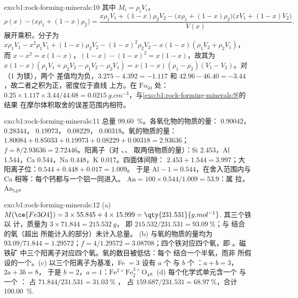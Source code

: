\begin{solution}{exo:b1:rock-forming-minerals:10}
其中 $M_i = \rho_i V_i$，
\[
  \rho(x) - \bigl(x\rho_1 + (1 - x)\rho_2\bigr)
  = \frac{x\rho_1V_1 + (1 - x)\rho_2V_2 - \bigl(x\rho_1 + (1 - x)\rho_2\bigr)\bigl(xV_1 + (1 - x)V_2\bigr)}{V(x)} .
\]
展开乘积，分子为 $x\rho_1V_1 - x^2\rho_1V_1 +
(1 - x)\rho_2V_2 - (1 - x)^2\rho_2V_2 - x(1 - x)(\rho_1V_2 + \rho_2V_1)$，而
$x - x^2 = x(1 - x)$，$(1 - x) - (1 - x)^2 = x(1 - x)$，故其为
$x(1 - x)(\rho_1V_1 + \rho_2V_2 - \rho_1V_2 - \rho_2V_1) =
x(1 - x)(\rho_1 - \rho_2)(V_1 - V_2)$。对（1 为镁），两个
差值均为负，$3.275 - 4.392 = -1.117$ 和 $42.96 - 46.40 =
-3.44$，故二者之积为正，密度位于直线
上方。在 $\text{Fo}_{50}$ 处：$0.25\times1.117\times3.44/44.68 =
\qty{0.0215}{g.cm^{-3}}$，与\cref{exo:b1:rock-forming-minerals:9}的结果
在摩尔体积取舍的误差范围内相符。
\end{solution}

\begin{solution}{exo:b1:rock-forming-minerals:11}
总量 \qty{99.60}{\percent}。各氧化物的物质的量： $0.90042$，
 $0.28344$， $0.19973$， $0.08229$，
 $0.00318$。氧的物质的量：$1.80084 + 0.85033 + 0.19973 + 0.08229 +
0.00318 = 2.93636$；$f = 8/2.93636 = 2.72446$。阳离子（对
、、 取两倍物质的量）：Si \num{2.453}，Al \num{1.544}，Ca
\num{0.544}，Na \num{0.448}，K \num{0.017}。四面体间隙：
$2.453 + 1.544 = 3.997$；大阳离子位：$0.544 + 0.448 + 0.017 = 1.009$。
于是 $\mathrm{Al} - 1 = 0.544$，在舍入范围内与 Ca 相等：每个钙都与一个铝一同进入。
$\mathrm{An} = 100\times0.544/1.009 = 53.9$：属
拉，$\text{An}_{54}$。
\end{solution}

\begin{solution}{exo:b1:rock-forming-minerals:12}
(a) $M(\ce{Fe3O4}) = 3\times55.845 + 4\times15.999 = \qty{231.531}{g.mol^{-1}}$.
其三个铁以  计，质量为 $3\times71.844 = \qty{215.532}{g}$，
即 $215.532/231.531 = \qty{93.09}{\percent}$；与
 结合的氧（超出  所能计入的部分）未计入总量。
(b)  与氧的物质的量均为 $93.09/71.844 = 1.29572$；$f =
4/1.29572 = 3.08708$；四个铁对应四个氧，即 。磁铁矿
中三个阳离子对应四个氧。氧的数目被低估：每个
 结合一个半氧，而非  所假设的一个。(c) 以三个阳离子为基准，Fe $= 3$
设有 $a$ 个  与 $b$ 个 ：$a + b = 3$，$2a + 3b = 8$，
于是 $b = 2$，$a = 1$：$\mathrm{Fe^{2+}Fe^{3+}_2O_4}$。(d) 每个化学式单元含一个  与
一个 ： 占 $71.844/231.531 = \qty{31.03}{\percent}$
， 占 $159.687/231.531 = \qty{68.97}{\percent}$，合计
\qty{100.00}{\percent}.
\end{solution}

